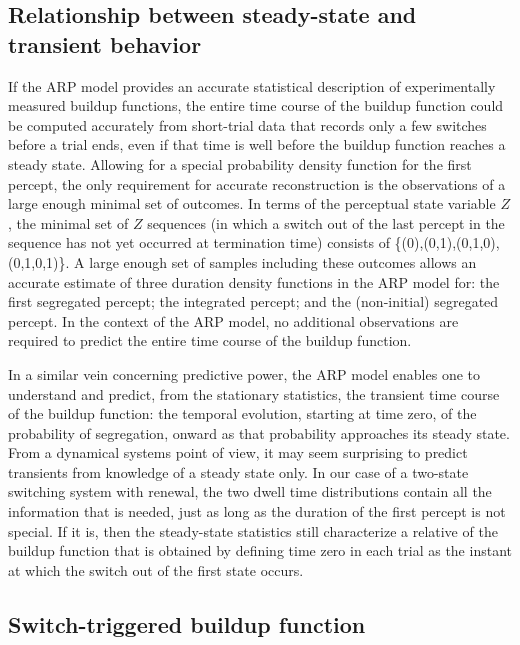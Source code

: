 \subsection{Relationship between steady-state and transient behavior}

If the ARP model provides an accurate statistical description of experimentally measured buildup functions, the entire time course of the buildup function could be computed accurately from short-trial data that records only a few switches before a trial ends, even if that time is well before the buildup function reaches a steady state. Allowing for a special probability density function for the first percept, the only requirement for accurate reconstruction is the observations of a large enough minimal set of outcomes. In terms of the perceptual state variable $Z$, the minimal set of $Z$ sequences (in which a switch out of the last percept in the sequence has not yet occurred at termination time) consists of \{(0),(0,1),(0,1,0),(0,1,0,1)\}.  A large enough set of samples including these outcomes allows an accurate estimate of three duration density functions in the ARP model for: the first segregated percept; the integrated percept; and the (non-initial) segregated percept. In the context of the ARP model, no additional observations are required to predict the entire time course of the buildup function.

In a similar vein concerning predictive power, the ARP model enables one to understand and predict, from the stationary statistics, the transient time course of the buildup function: the temporal evolution, starting at time zero, of the probability of segregation, onward as that probability approaches its steady state. From a dynamical systems point of view, it may seem surprising to predict transients from knowledge of a steady state only. In our case of a two-state switching system with renewal, the two dwell time distributions contain all the information that is needed, just as long as the duration of the first percept is not special. If it is, then the steady-state statistics still characterize a relative of the buildup function that is obtained by defining time zero in each trial as the instant at which the switch out of the first state occurs.


\subsection{Switch-triggered buildup function} \label{ssec:switch}

